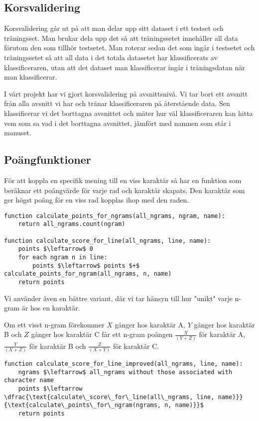 \documentclass[a4paper]{article}
\begin{document}
\subsection{Korsvalidering}
Korsvalidering går ut på att man delar upp sitt dataset i ett testset och
träningsset. Man brukar dela upp det så att träningssetet innehåller all data
förutom den som tillhör testsetet. Man roterar sedan det som ingår i testsetet
och träningssetet så att all data i det totala datasetet har klassificerats av
klassificeraren, utan att det dataset man klassificerar ingår i träningsdatan
när man klassificerar.

I vårt projekt har vi gjort korsvalidering på avsnittsnivå. Vi tar bort ett
avsnitt från alla avsnitt vi har och tränar klassificeraren på återstående data.
Sen klassificerar vi det borttagna avsnittet och mäter hur väl klassificeraren
kan hitta vem som sa vad i det borttagna avsnittet, jämfört med namnen som står
i manuset.

\subsection{Poängfunktioner}
För att koppla en specifik mening till en viss karaktär så har en funktion som
beräknar ett poängvärde för varje rad och karaktär skapats. Den karaktär som ger
högst poäng för en viss rad kopplas ihop med den raden.

\begin{lstlisting}[mathescape, columns=fullflexible, basicstyle=\fontfamily{lmvtt}\selectfont]
function calculate_points_for_ngrams(all_ngrams, ngram, name):
    return all_ngrams.count(ngram)

function calculate_score_for_line(all_ngrams, line, name):
    points $\leftarrow$ 0
    for each ngram n in line:
        points $\leftarrow$ points $+$ calculate_points_for_ngram(all_ngrams, n, name)
    return points
\end{lstlisting}

Vi använder även en bättre variant, där vi tar hänsyn till hur "unikt" varje
n-gram är hos en karaktär.

Om ett visst n-gram förekommer $X$ gånger hos karaktär A, $Y$ gånger hos karaktär B
och $Z$ gånger hos karaktär C får ett n-gram poängen $\frac{X}{(Y+Z)}$ för karaktär A,
$\frac{Y}{(X+Z)}$ för karaktär B och $\frac{Z}{(X+Y)}$ för karaktär C.

\begin{lstlisting}[mathescape, columns=fullflexible, basicstyle=\fontfamily{lmvtt}\selectfont]
function calculate_score_for_line_improved(all_ngrams, line, name):
    ngrams $\leftarrow$ all_ngrams without those associated with character name 
    points $\leftarrow  \dfrac{\text{calculate\_score\_for\_line(all\_ngrams, line, name)}}{\text{calculate\_points\_for\_ngram(ngrams, n, name)}}$
    return points
\end{lstlisting}
\end{document}
